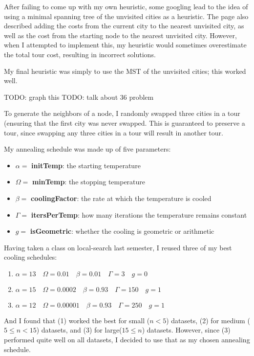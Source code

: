\documentclass[12pt]{article}
\begin{document}
\problemasub
After failing to come up with my own heuristic, some googling lead to the idea of using a minimal spanning tree of the
unvisited cities as a heuristic. The page also described adding the costs from the current city to the nearest unvisited
city, as well as the cost from the starting node to the nearest unvisited city. However, when I attempted to implement
this, my heuristic would sometimes overestimate the total tour cost, resulting in incorrect solutions.

My final heuristic was simply to use the MST of the unvisited cities; this worked well.

\problemasub
TODO: graph this
TODO: talk about 36 problem



\problemasub
To generate the neighbors of a node, I randomly swapped three cities in a tour (ensuring that the first city was never
swapped. This is guaranteed to preserve a tour, since swapping any three cities in a tour will result in another tour.

\problemasub
My annealing schedule was made up of five parameters:
\begin{itemize}
    \item $\alpha = $ \textbf{initTemp}: the starting temperature
    \item $\Omega = $ \textbf{minTemp}: the stopping temperature
    \item $\beta = $ \textbf{coolingFactor}: the rate at which the temperature is cooled
    \item $\Gamma = $ \textbf{itersPerTemp}: how many iterations the temperature remains constant
    \item $g = $ \textbf{isGeometric}: whether the cooling is geometric or arithmetic
\end{itemize}

Having taken a class on local-search last semester, I reused three of my best cooling schedules:
\begin{enumerate}
    \item $\alpha = 13\quad \Omega = 0.01\quad \beta = 0.01\quad \Gamma = 3\quad g = 0$
    \item $\alpha = 15\quad \Omega = 0.0002\quad \beta = 0.93\quad \Gamma = 150\quad g = 1$
    \item $\alpha = 12\quad \Omega = 0.00001\quad \beta = 0.93\quad \Gamma = 250\quad g = 1$
\end{enumerate}

And I found that (1) worked the best for small ($n < 5$) datasets, (2) for medium ($5 \leq n < 15$) datasets, and (3)
for large($15 \leq n$) datasets. However, since (3) performed quite well on all datasets, I decided to use that as my
chosen annealing schedule.
\end{document}
